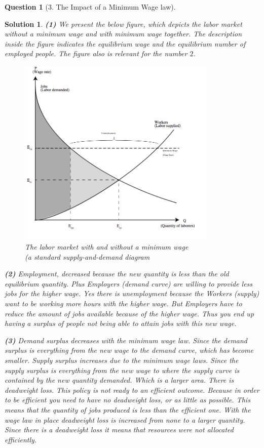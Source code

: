 \documentclass{article} %
\theoremstyle{quest}
\newtheorem*{question}{Question}
\newtheorem*{solution}{Solution}
\begin{document}
\pagebreak

\begin{question}[3. The Impact of a Minimum Wage law]
\end{question}
\begin{solution}
\textbf{(1)}
We present the below figure, which depicts the labor market without a minimum wage and with minimum
wage together. The description inside the figure indicates the equilibrium wage and the equilibrium
number of employed people. The figure also is relevant for the number $2$.
\begin{figure}[h!]
  \caption{The labor market with and without a minimum wage \\ (a standard supply-and-demand diagram}
    \centering
  \includegraphics[width=0.85\textwidth]{graph3.jpg}
\end{figure}
\smallskip

\textbf{(2)}
Employment, decreased because the new quantity is less than the old equilibrium quantity. Plus Employers (demand curve) are willing to provide less jobs for the higher wage. Yes there is unemployment because the Workers (supply) want to be working more hours with the higher wage. But Employers have to reduce the amount of jobs available because of the higher wage. Thus you end up having a surplus of people not being able to attain jobs with this new wage. 

\pagebreak

\textbf{(3)}
Demand surplus decreases with the minimum wage law. Since the demand surplus is everything from the new wage to the demand curve, which has become smaller. Supply surplus increases due to the minimum wage laws. Since the supply surplus is everything from the new wage to where the supply curve is contained by the new quantity demanded. Which is a larger area. There is deadweight loss. This policy is not ready to an efficient outcome. Because in order to be efficient you need to have no deadweight loss, or as little as possible. This means that the quantity of jobs produced is less than the efficient one. With the wage law in place deadweight loss is increased from none to a larger quantity. Since there is a deadweight loss it means that resources were not allocated efficiently.

\end{solution}
\end{document}
